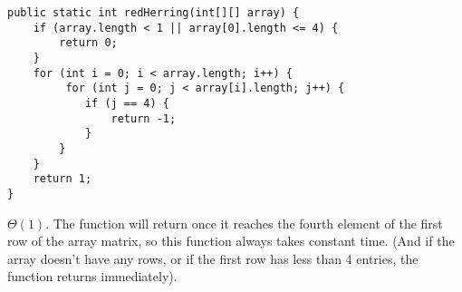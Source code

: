 \begin{blocksection}
\question
\begin{lstlisting}
public static int redHerring(int[][] array) {
    if (array.length < 1 || array[0].length <= 4) {
        return 0;
    }
    for (int i = 0; i < array.length; i++) {
         for (int j = 0; j < array[i].length; j++) {
            if (j == 4) {
                return -1;
            }
        }
    }
    return 1;
}
\end{lstlisting}

\begin{solution}
$\Theta(1)$. The function will return once it reaches the fourth element of the first row of the array matrix, so this function always takes constant time. (And if the array doesn't have any rows, or if the first row has less than 4 entries, the function returns immediately).
\end{solution}
\end{blocksection}
